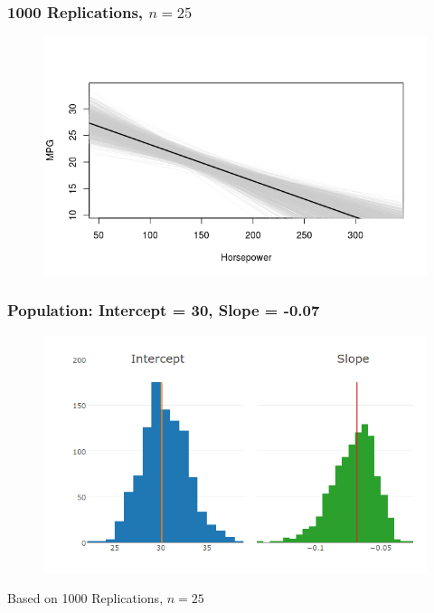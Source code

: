 \documentclass{beamer}
\begin{document}
\begin{frame}
\frametitle{1000 Replications, $n=25$}

\begin{figure}[h]
\centering
\includegraphics[scale = 0.6]{./images/carsFittedSims}

\end{figure}


\end{frame}


\begin{frame}
\frametitle{Population: Intercept = 30, Slope = -0.07}

\begin{figure}[h]
\centering
\includegraphics[scale = 0.45]{./images/OLSsims}

\end{figure}
\alert{Based on 1000 Replications, $n = 25$}

\end{frame}
\end{document}
